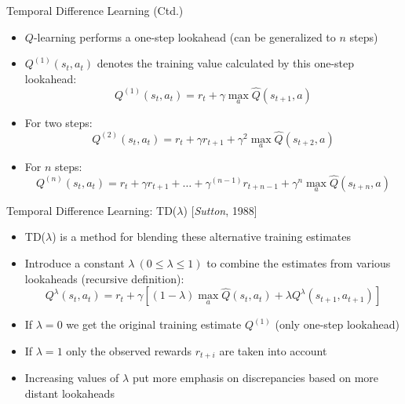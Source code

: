 \begin{frame}{Temporal Difference Learning (Ctd.)}{}
	\begin{itemize}
		\item $Q$-learning performs a one-step lookahead (can be generalized to $n$ steps)
		\item $Q^{(1)}(s_t, a_t)$ denotes the training value calculated by this one-step lookahead:
		\begin{equation}
			Q^{(1)}(s_t, a_t) = r_t + \gamma \max_a \widehat{Q}(s_{t+1}, a)
		\end{equation}
		\item For two steps:
		\begin{equation}
			Q^{(2)}(s_t, a_t) = r_t + \gamma r_{t+1} + \gamma^2 \max_a \widehat{Q}(s_{t+2}, a)
		\end{equation}
		\item For $n$ steps:
		\begin{equation}
			Q^{(n)}(s_t, a_t) = r_t + \gamma r_{t+1} + \dots + \gamma^{(n-1)} r_{t+n-1} +
				\gamma^n \max_a \widehat{Q}(s_{t+n}, a)
		\end{equation}
	\end{itemize}
\end{frame}


\begin{frame}{Temporal Difference Learning: TD($\lambda$) [\textit{Sutton}, 1988]}{}
	\begin{itemize}
		\item TD($\lambda$) is a method for blending these alternative training estimates
		\item Introduce a constant $\lambda\ (0 \le \lambda \le 1)$ to combine the estimates from various lookaheads
			(recursive definition):
		\begin{equation*}
			Q^{\lambda}(s_t, a_t) = r_t + \gamma \left[ (1 - \lambda) \max_a \widehat{Q}(s_t, a_t) +
				\lambda Q^{\lambda}(s_{t+1}, a_{t+1}) \right]
		\end{equation*}
		\item If $\lambda = 0$ we get the original training estimate $Q^{(1)}$ (only one-step lookahead)
		\item If $\lambda = 1$ only the observed rewards $r_{t+i}$ are taken into account
		\item Increasing values of $\lambda$ put more emphasis on discrepancies based on more distant lookaheads
	\end{itemize}
\end{frame}


